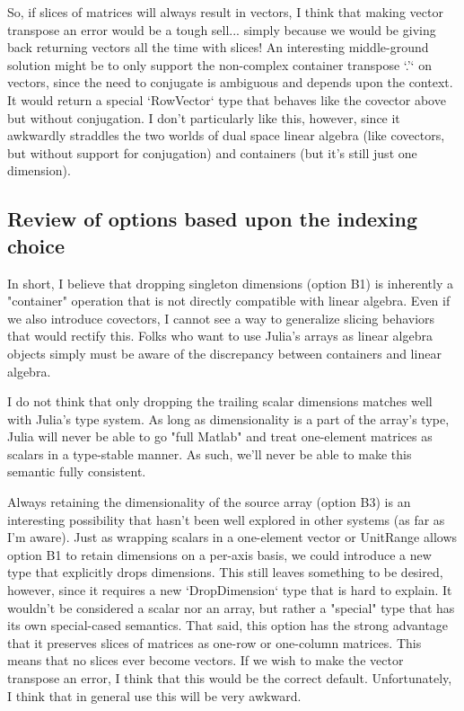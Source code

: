 So, if slices of matrices will always result in vectors, I think that making
vector transpose an error would be a tough sell... simply because we would be
giving back returning vectors all the time with slices! An interesting
middle-ground solution might be to only support the non-complex container
transpose `.'` on vectors, since the need to conjugate is ambiguous and depends
upon the context. It would return a special `RowVector` type that behaves like
the covector above but without conjugation. I don't particularly like this,
however, since it awkwardly straddles the two worlds of dual space linear
algebra (like covectors, but without support for conjugation) and containers
(but it's still just one dimension).

\subsection{Review of options based upon the indexing choice}

In short, I believe that dropping singleton dimensions (option B1) is
inherently a "container" operation that is not directly compatible with linear
algebra. Even if we also introduce covectors, I cannot see a way to generalize
slicing behaviors that would rectify this. Folks who want to use Julia's arrays
as linear algebra objects simply must be aware of the discrepancy between
containers and linear algebra.

I do not think that only dropping the trailing scalar dimensions matches well
with Julia's type system. As long as dimensionality is a part of the array's
type, Julia will never be able to go "full Matlab" and treat one-element
matrices as scalars in a type-stable manner. As such, we'll never be able to
make this semantic fully consistent.

Always retaining the dimensionality of the source array (option B3) is an
interesting possibility that hasn't been well explored in other systems (as far
as I'm aware). Just as wrapping scalars in a one-element vector or UnitRange
allows option B1 to retain dimensions on a per-axis basis, we could introduce a
new type that explicitly drops dimensions. This still leaves something to be
desired, however, since it requires a new `DropDimension` type that is hard to
explain. It wouldn't be considered a scalar nor an array, but rather a
"special" type that has its own special-cased semantics. That said, this option
has the strong advantage that it preserves slices of matrices as one-row or
one-column matrices. This means that no slices ever become vectors. If we wish
to make the vector transpose an error, I think that this would be the correct
default. Unfortunately, I think that in general use this will be very awkward.

